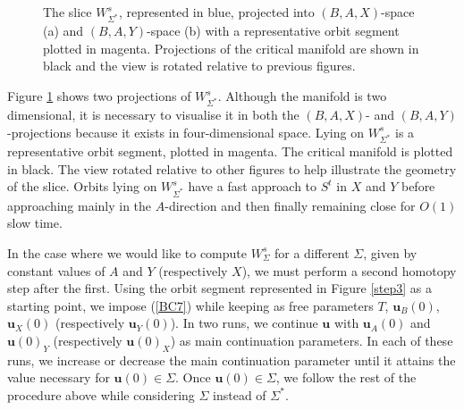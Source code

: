 \documentclass{ws-ijbc}
\begin{document}
\begin{figure}[h]
\centering
{}
\caption{The slice $W^{s}_{\Sigma^*}$, represented in blue, projected into $(B,A,X)$-space (a) and $(B,A,Y)$-space (b) with a representative orbit segment plotted in magenta.  Projections of the critical manifold are shown in black and the view is rotated relative to previous figures.}
\label{piece}
\end{figure}
   
Figure \ref{piece} shows two projections of $W^s_{\Sigma^*}$.  Although the manifold is two dimensional, it is necessary to visualise it in both the $(B,A,X)$- and $(B,A,Y)$-projections because it exists in four-dimensional space.  Lying on $W^s_{\Sigma^*}$ is a representative orbit segment, plotted in magenta.  The critical manifold is plotted in black.  The view rotated relative to other figures to help illustrate the geometry of the slice.  Orbits lying on $W^s_{\Sigma^*}$ have a fast approach to $S^t$ in $X$ and $Y$ before approaching mainly in the $A$-direction and then finally remaining close for $O(1)$ slow time.
    
In the case where we would like to compute $W^{s}_{\Sigma}$ for a different $\Sigma$, given by constant values of $A$ and $Y$ (respectively $X$), we must perform a second homotopy step after the first.  Using the orbit segment represented in Figure \ref{step3} as a starting point, we impose (\ref{BC7}) while keeping as free parameters $T$, $\mathbf{u}_B(0)$, $\mathbf{u}_X(0)$ (respectively $\mathbf{u}_Y(0)$).  In two runs, we continue $\mathbf{u}$ with $\mathbf{u}_A(0)$ and $\mathbf{u}(0)_Y$ (respectively $\mathbf{u}(0)_X$) as main continuation parameters.  In each of these runs, we increase or decrease the main continuation parameter until it attains the value necessary for $\mathbf{u}(0) \in \Sigma$.  Once $\mathbf{u}(0) \in \Sigma$, we follow the rest of the procedure above while considering $\Sigma$ instead of $\Sigma^*$.
    
\end{document}

